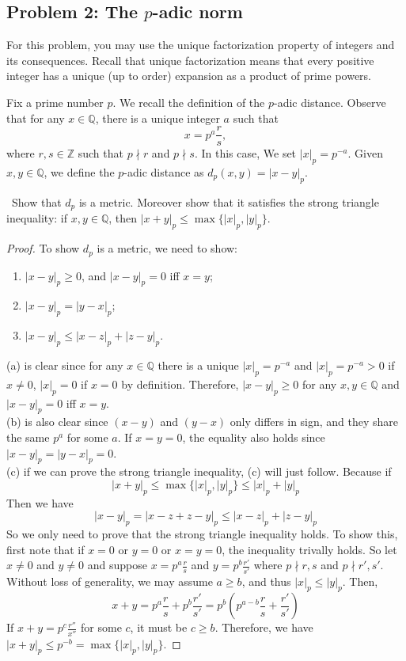\documentclass[12pt,a4paper]{amsart}
\newcommand{\bbQ}{\mathbb{Q}}
\newcommand{\bbZ}{\mathbb{Z}}
\newcommand{\turnin}{\faPencilSquareO}
\begin{document}
\subsection*{Problem 2: The $p$-adic norm}
For this problem, you may use the unique factorization property of integers and its consequences.
Recall that unique factorization means that every positive integer has a unique (up to order) expansion as a product of prime powers.

Fix a prime number $p$.
We recall the definition of the $p$-adic distance.
Observe that for any $x \in \bbQ$, there is a unique integer $a$ such that
\[
  x = p^a \frac{r}{s},
\]
where $r, s \in \bbZ$ such that $p \nmid r$ and $p \nmid s$.
In this case, We set $|x|_p = p^{-a}$.
Given $x, y \in \bbQ$, we define the $p$-adic distance as $d_p(x,y) = |x-y|_p$.
\begin{compactenum}[(a)]
\item \turnin\ Show that $d_p$ is a metric.
  Moreover show that it satisfies the strong triangle inequality: if $x, y\in \bbQ$, then $|x+y|_p \leq \max\{|x|_p,|y|_p\}$.

  \begin{proof}
    To show $d_p$ is a metric, we need to show:
      \begin{enumerate}
        \item $|x-y|_p \ge 0$, and $|x-y|_p = 0$ iff $x=y$;
        \item $|x-y|_p = |y-x|_p$;
        \item $|x-y|_p \le |x-z|_p + |z-y|_p$.
      \end{enumerate}
      (a) is clear since for any $x \in \bbQ$ there is a unique $|x|_p = p^{-a}$ and
      $|x|_p = p^{-a} > 0$ if $x\neq 0$, $|x|_p = 0$ if $x=0$ by definition.
      Therefore, $|x-y|_p \ge 0$ for any $x,y\in\bbQ$ and $|x-y|_p = 0$ iff $x=y$.\\
      (b) is also clear since $(x-y)$ and $(y-x)$ only differs in sign, and they
      share the same $p^a$ for some $a$. If $x=y=0$, the equality also holds
      since $|x-y|_p = |y-x|_p = 0$. \\
      (c) if we can prove the strong triangle inequality, (c) will just follow. Because if
      $$ |x+y|_p \leq \max\{|x|_p,|y|_p\} \leq |x|_p + |y|_p $$
      Then we have
      $$ |x-y|_p = |x-z+z-y|_p \leq |x-z|_p + |z-y|_p $$
      So we only need to prove that the strong triangle inequality holds.
      To show this, first note that if $x=0$ or $y=0$ or $x=y=0$, the inequality trivally holds.
      So let $x\neq 0$ and $y\neq 0$ and suppose $x=p^a \frac{r}{s}$ and $y=p^b\frac{r'}{s'}$
      where $p \nmid r,s$ and $p \nmid r',s'$.
      Without loss of generality, we may assume $a\ge b$, and thus $|x|_p \le |y|_p$. Then,
      $$ x+y = p^a \frac{r}{s} + p^b\frac{r'}{s'} = p^b\left(p^{a-b} \frac{r}{s} + \frac{r'}{s'}\right)  $$
      If $x+y = p^c \frac{r''}{x''}$ for some $c$, it must be $c\ge b$.
      Therefore, we have $|x+y|_p \le p^{-b} = \max\{|x|_p,|y|_p\}$.
  \end{proof}


\end{compactenum}
\end{document}
